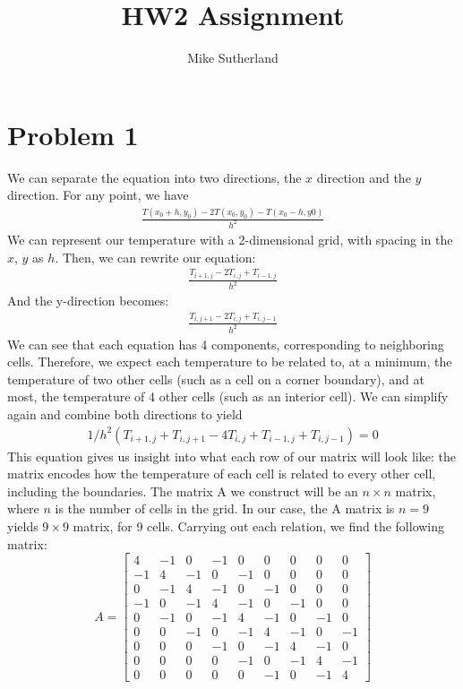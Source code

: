 \documentclass[10pt,letterpaper,notitlepage]{article}
\author{Mike Sutherland}
\title{HW2 Assignment}
\begin{document}
	\maketitle
	\section{Problem 1}
	We can separate the equation into two directions, the $x$ direction and the $y$ direction. For any point, we have
	\begin{align*}
		\frac{T(x_0 + h, y_0) - 2 T(x_0, y_0) - T(x_0 -h, y0)}{h^2}
	\end{align*}
	We can represent our temperature with a 2-dimensional grid, with spacing in the $x$, $y$ as $h$. Then, we can rewrite our equation:
	\begin{align*}
		\frac{T_{i+1, j} - 2 T_{i, j} + T_{i-1, j}}{h^2}
	\end{align*} 
	And the y-direction becomes:
	\begin{align*}
		\frac{T_{i, j+1} - 2 T_{i, j} + T_{i, j-1}}{h^2}
	\end{align*}
	We can see that each equation has 4 components, corresponding to neighboring cells. Therefore, we expect each temperature to be related to, at a minimum, the temperature of two other cells (such as a cell on a corner boundary), and at most, the temperature of 4 other cells (such as an interior cell).
	We can simplify again and combine both directions to yield 
	\begin{align*}
		1/h^2 \left(  T_{i+1, j} + T_{i, j+1} -4 T_{i,j} +T_{i-1, j} + T_{i, j-1} \right) = 0
	\end{align*}
	This equation gives us insight into what each row of our matrix will look like: the matrix encodes how the temperature of each cell is related to every other cell, including the boundaries. The matrix A we construct will be an $n \times n$ matrix, where $n$ is the number of cells in the grid. In our case, the A matrix is $n = 9$ yields $9 \times 9$ matrix, for 9 cells.
	Carrying out each relation, we find the following matrix:
	\begin{equation}
		A= \begin{bmatrix}
			4 &-1 &0 &-1 &0 &0 &0 &0 &0 \\
			-1 &4 &-1 &0 &-1 &0 &0 &0 &0 \\
			0 &-1 &4 &-1 &0 &-1 &0 &0 &0 \\
			-1 &0 &-1 &4 &-1 &0 &-1 &0 &0 \\
			0 &-1 &0 &-1 &4 &-1 &0 &-1 &0 \\
			0 &0 &-1 &0 &-1 &4 &-1 &0 &-1 \\
			0 &0 &0 &-1 &0 &-1 &4 &-1 &0 \\
			0 &0 &0 &0 &-1 &0 &-1 &4 &-1 \\
			0 &0 &0 &0 &0 &-1 &0 &-1 &4 
		\end{bmatrix}\label{eqn:A}
	\end{equation}
\end{document}

